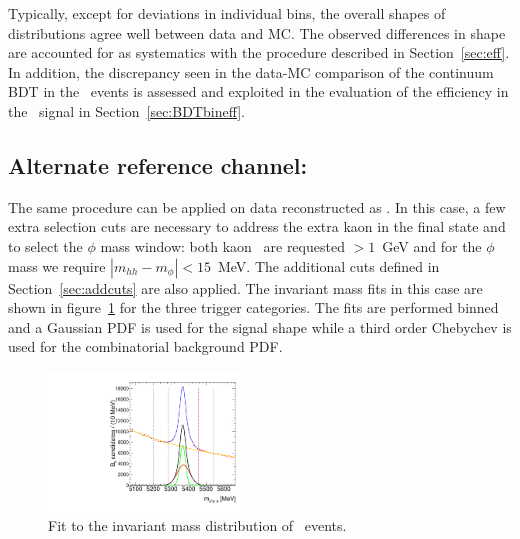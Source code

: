 Typically, except for deviations in individual bins, the overall shapes
of distributions agree well between data and MC. The observed differences
in shape are accounted for as systematics with the procedure described in
Section~\ref{sec:eff}. In addition, the discrepancy seen in the
data-MC comparison of the continuum BDT in the \BpKpJpsi\ events is
assessed and exploited in the evaluation of the efficiency in the
\Bsmumu\ signal in Section~\ref{sec:BDTbineff}.



\subsection{Alternate reference channel: \BsJpsiPhi}
\label{sec:compjpsiphi}

The same procedure can be applied on data reconstructed as \BsJpsiPhi.
In this case, a few extra selection cuts are necessary to address the extra
kaon in the final state and to select the $\phi$ mass window:
both kaon \pt\ are requested $>1$~GeV and for the $\phi$ mass we require
$|m_{hh}-m_{\phi}|<15$~MeV. The additional cuts defined in
Section~\ref{sec:addcuts} are also applied.
The invariant mass fits in this case are shown in figure~\ref{fig:jpsiphi}
for the three trigger categories.
The fits are performed binned and a Gaussian PDF is used for the signal shape
while a third order Chebychev is used for the combinatorial background PDF.


\begin{figure}[!htb]
\begin{center}
\hspace*{-1cm}
\includegraphics[width=0.47\textwidth]{figures/InternalNote_DataMCComparison/Bs/bsjpsiphibinnedfit.pdf}
\caption{Fit to the invariant mass distribution of \BsJpsiPhi\ events.}
\label{fig:jpsiphi}
\end{center}
\end{figure}

